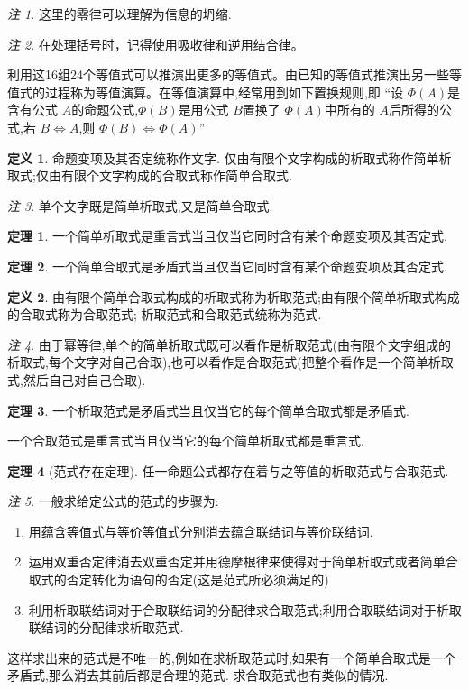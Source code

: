 \documentclass[a4paper,11pt]{article}%
\theoremstyle{remark}
\newtheorem*{remark}{注}
\theoremstyle{remark}
\theoremstyle{definition}
\newtheorem{theorem}{定理}[section]
\theoremstyle{definition}
\newtheorem*{definition}{定义}
\theoremstyle{plain}
\begin{document}
\begin{remark}
    这里的零律可以理解为信息的坍缩.
\end{remark}
\begin{remark}
    在处理括号时，记得使用吸收律和逆用结合律。
\end{remark}
利用这16组24个等值式可以推演出更多的等值式。由已知的等值式推演出另一些等值式的过程称为等值演算。在等值演算中,经常用到如下置换规则,即
``设 $\Phi(A)$是含有公式 $A$的命题公式,$\Phi(B)$是用公式 $B$置换了 $\Phi(A)$中所有的 $A$后所得的公式,若 $B\Leftrightarrow A$,则 $\Phi(B)\Leftrightarrow\Phi(A)$''
\begin{definition}
    命题变项及其否定统称作文字.
    仅由有限个文字构成的析取式称作简单析取式;仅由有限个文字构成的合取式称作简单合取式. 
\end{definition}
\begin{remark}
    单个文字既是简单析取式,又是简单合取式.
\end{remark}
\begin{theorem}
    一个简单析取式是重言式当且仅当它同时含有某个命题变项及其否定式.
\end{theorem}
\begin{theorem}
    一个简单合取式是矛盾式当且仅当它同时含有某个命题变项及其否定式.
\end{theorem}
\begin{definition}
    由有限个简单合取式构成的析取式称为析取范式;由有限个简单析取式构成的合取式称为合取范式;
    析取范式和合取范式统称为范式.
\end{definition}
\begin{remark}
    由于幂等律,单个的简单析取式既可以看作是析取范式(由有限个文字组成的析取式,每个文字对自己合取),也可以看作是合取范式(把整个看作是一个简单析取式,然后自己对自己合取).
\end{remark}
\begin{theorem}
    一个析取范式是矛盾式当且仅当它的每个简单合取式都是矛盾式.

    一个合取范式是重言式当且仅当它的每个简单析取式都是重言式.
\end{theorem}
\begin{theorem}[范式存在定理]
   任一命题公式都存在着与之等值的析取范式与合取范式. 
\end{theorem}
\begin{remark}
    一般求给定公式的范式的步骤为:
    \begin{enumerate}
        \item 用蕴含等值式与等价等值式分别消去蕴含联结词与等价联结词.
        \item 运用双重否定律消去双重否定并用德摩根律来使得对于简单析取式或者简单合取式的否定转化为语句的否定(这是范式所必须满足的)
        \item 利用析取联结词对于合取联结词的分配律求合取范式;利用合取联结词对于析取联结词的分配律求析取范式.
    \end{enumerate}
    这样求出来的范式是不唯一的,例如在求析取范式时,如果有一个简单合取式是一个矛盾式,那么消去其前后都是合理的范式.
    求合取范式也有类似的情况.
\end{remark}
\end{document}
